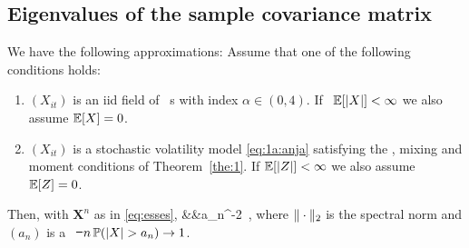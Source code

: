 \subsection{Eigenvalues of the sample covariance matrix}\label{subsec:eigen}
We have the following approximations:
\bth\label{lem:1}
Assume that one of the following conditions holds:
\begin{enumerate}
\item
$(X_{it})$ is an iid field of \regvary\ \rv s with index 
$\alpha\in (0,4)$. If \ ${\mathbb E}[|X|]<\infty$ we also assume ${\mathbb E}[X]=0$.
\item
$(X_{it})$ is a stochastic volatility model \eqref{eq:1a:anja} satisfying
the \regvar , mixing and moment conditions of Theorem~\ref{the:1}.
If ${\mathbb E} [|Z|]<\infty$ we also assume ${\mathbb E}[Z]=0$. 
\end{enumerate}
Then, with $\mathbf{X}^n$ as in \eqref{eq:esses},
\beao
&&a_n^{-2} \,,
\eeao
where $\|\cdot\|_2$ is the spectral norm and 
$(a_n)$ is a \seq\ \st\ $n\,\P(|X|>a_n)\to 1$.
\ethe
